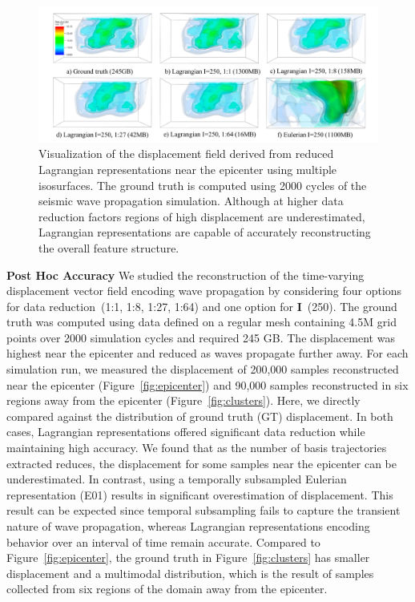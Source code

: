 \documentclass[runningheads]{llncs}
\begin{document}
\begin{figure}[!t]
\centering
\includegraphics[width=\linewidth, trim={1cm, 0cm, 0.9cm, 0cm}, clip]{sw4_figure_small.pdf}
\vspace{-5mm}
\caption{Visualization of the displacement field derived from reduced Lagrangian representations near the epicenter using multiple isosurfaces. The ground truth is computed using 2000 cycles of the seismic wave propagation simulation. Although at higher data reduction factors regions of high displacement are underestimated, Lagrangian representations are capable of accurately reconstructing the overall feature structure.}
\vspace{-5mm}
\label{fig:sw4_figure}
\end{figure}

\noindent\textbf{Post Hoc Accuracy}
We studied the reconstruction of the time-varying displacement vector field encoding wave propagation by considering four options for data reduction~(1:1, 1:8, 1:27, 1:64) and one option for \textbf{I}~(250).
%
The ground truth was computed using data defined on a regular mesh containing 4.5M grid points over 2000 simulation cycles and required 245 GB.
%
The displacement was highest near the epicenter and reduced as waves propagate further away.
%
For each simulation run, we measured the displacement of 200,000 samples reconstructed near the epicenter (Figure~\ref{fig:epicenter}) and 90,000 samples reconstructed in six regions away from the epicenter (Figure~\ref{fig:clusters}).
%
Here, we directly compared against the distribution of ground truth (GT) displacement.
%
In both cases, Lagrangian representations offered significant data reduction while maintaining high accuracy.
%
We found that as the number of basis trajectories extracted reduces, the displacement for some samples near the epicenter can be underestimated.
%
In contrast, using a temporally subsampled Eulerian representation (E01) results in significant overestimation of displacement.
%
This result can be expected since temporal subsampling fails to capture the transient nature of wave propagation, whereas Lagrangian representations encoding behavior over an interval of time remain accurate.
%
Compared to Figure~\ref{fig:epicenter}, the ground truth in Figure~\ref{fig:clusters} has smaller displacement and a multimodal distribution, which is the result of samples collected from six regions of the domain away from the epicenter.
%
\end{document}
